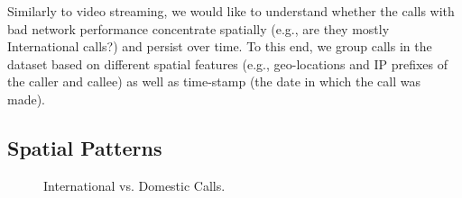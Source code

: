 Similarly to video streaming, we would like to understand whether
the calls with bad network performance concentrate spatially 
(e.g., are they mostly International calls?) and persist
over time. To this end, we group calls in the dataset based on 
different spatial features (e.g., geo-locations and IP prefixes 
of the caller and callee) as well as time-stamp (the date in which
the call was made).



\subsection{Spatial Patterns}
\label{subsec:measurement:voip:spatial}




\begin{figure}[t!]
\centering
{}
\caption{International vs. Domestic Calls.}
\label{fig:country}
\end{figure}

